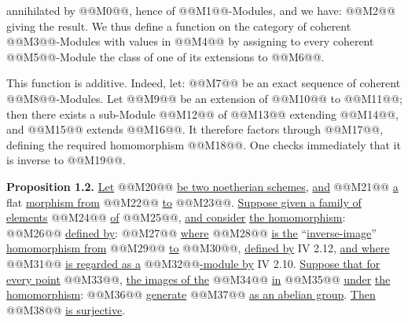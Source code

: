 annihilated by @@M0@@, hence of @@M1@@-Modules, and we have:
@@M2@@
giving the result. We thus define a function on the category of coherent @@M3@@-Modules with values in @@M4@@ by assigning to every coherent @@M5@@-Module the class of one of its extensions to @@M6@@.

This function is additive. Indeed, let:
@@M7@@
be an exact sequence of coherent @@M8@@-Modules. Let @@M9@@ be an extension of @@M10@@ to @@M11@@; then there exists a sub-Module @@M12@@ of @@M13@@ extending @@M14@@, and @@M15@@ extends @@M16@@. It therefore factors through @@M17@@, defining the required homomorphism @@M18@@. One checks immediately that it is inverse to @@M19@@.

\textbf{Proposition 1.2.} \uline{Let} @@M20@@ \uline{be two noetherian schemes}, \uline{and} @@M21@@ \uline{a} flat \uline{morphism from} @@M22@@ \uline{to} @@M23@@. \uline{Suppose given a family of elements} @@M24@@ \uline{of} @@M25@@, \uline{and consider} \uline{the homomorphism}:
@@M26@@
\uline{defined by}:
@@M27@@
\uline{where} @@M28@@ \uline{is the} ``\uline{inverse-image}'' \uline{homomorphism from} @@M29@@ \uline{to} @@M30@@, \uline{defined by} IV 2.12, \uline{and where} @@M31@@ \uline{is regarded as a} @@M32@@\uline{-module by} IV 2.10. \uline{Suppose that for every point} @@M33@@, \uline{the images of the} @@M34@@ \uline{in} @@M35@@ \uline{under} \uline{the homomorphism}:
@@M36@@
\uline{generate} @@M37@@ \uline{as an abelian group}. \uline{Then} @@M38@@ \uline{is surjective}.
